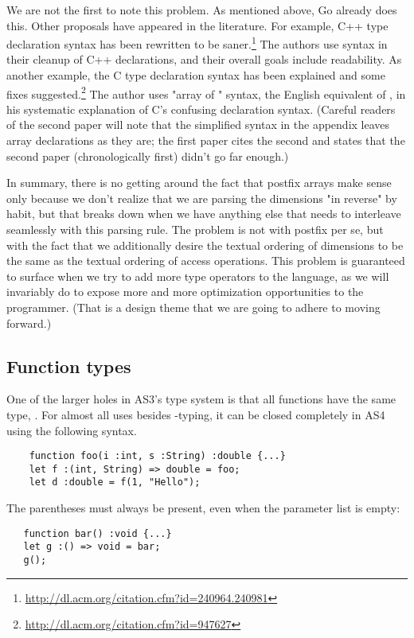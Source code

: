 We are not the first to note this problem. As mentioned above, Go
already does this. Other proposals have appeared in the
literature.
For example, C++ type declaration syntax has been rewritten to be
saner.\footnote{\url{http://dl.acm.org/citation.cfm?id=240964.240981}}
 The authors use  syntax in their cleanup of C++
 declarations, and their overall goals include readability.
As another example, the C type declaration syntax has been explained and some
fixes suggested.\footnote{\url{http://dl.acm.org/citation.cfm?id=947627}} The author uses "array of " syntax, the
English equivalent of , in his systematic explanation of
C's confusing declaration syntax.
(Careful readers of the second paper will note that the simplified
syntax in the appendix leaves array declarations as they are; the
first paper cites the second and states that the second paper
(chronologically first) didn't go far enough.)

In summary, there is no getting around the fact that postfix arrays
make sense only because we don't realize that we are parsing the
dimensions "in reverse" by habit, but that breaks down when we have
anything else that needs to interleave seamlessly with this parsing
rule. The problem is not with postfix per se, but with the fact that
we additionally desire the textual ordering of dimensions to be the
same as the textual ordering of access operations. This problem is
guaranteed to surface when we try to add more type operators to the
language, as we will invariably do to expose more and more
optimization opportunities to the programmer. (That is a design theme
that we are going to adhere to moving forward.)

\subsection{Function types}
One of the larger holes in AS3's type system is that all functions have the same
type, . For almost all uses besides \code{*}-typing, it can be
closed completely in AS4 using the following syntax.
\begin{verbatim}
    function foo(i :int, s :String) :double {...}
    let f :(int, String) => double = foo;
    let d :double = f(1, "Hello");
\end{verbatim}
The parentheses must always be present, even when the parameter list is empty:
\begin{verbatim}
   function bar() :void {...}
   let g :() => void = bar;
   g();
\end{verbatim}


